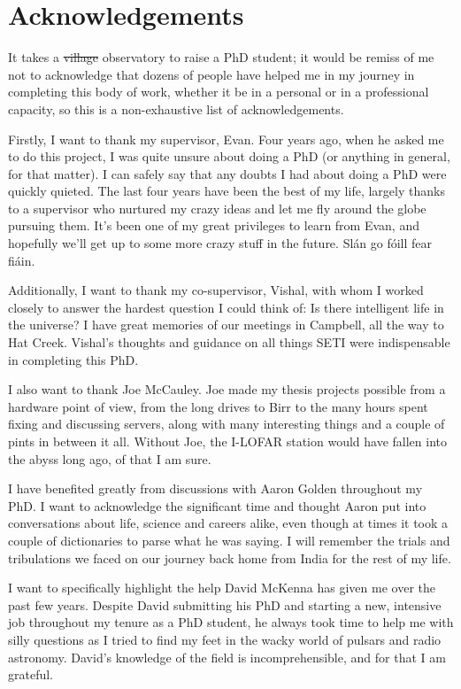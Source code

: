 \section*{Acknowledgements}

It takes a \sout{village} observatory to raise a PhD student; it would be remiss of me not to acknowledge that dozens of people have helped me in my journey in completing this body of work, whether it be in a personal or in a professional capacity, so this is a non-exhaustive list of acknowledgements.

Firstly, I want to thank my supervisor, Evan. Four years ago, when he asked me to do this project, I was quite unsure about doing a PhD (or anything in general, for that matter). I can safely say that any doubts I had about doing a PhD were quickly quieted. The last four years have been the best of my life, largely thanks to a supervisor who nurtured my crazy ideas and let me fly around the globe pursuing them.  It’s been one of my great privileges to learn from Evan, and hopefully we’ll get up to some more crazy stuff in the future. Slán go fóill fear fiáin. 

Additionally, I want to thank my co-supervisor, Vishal, with whom I worked closely to answer the hardest question I could think of: Is there intelligent life in the universe? I have great memories of our meetings in Campbell, all the way to Hat Creek. Vishal’s thoughts and guidance on all things SETI were indispensable in completing this PhD. 

I also want to thank Joe McCauley. Joe made my thesis projects possible from a hardware point of view, from the long drives to Birr to the many hours spent fixing and discussing servers, along with many interesting things and a couple of pints in between it all. Without Joe, the I-LOFAR station would have fallen into the abyss long ago, of that I am sure. 

I have benefited greatly from discussions with Aaron Golden throughout my PhD. I want to acknowledge the significant time and thought Aaron put into conversations about life, science and careers alike, even though at times it took a couple of dictionaries to parse what he was saying. I will remember the trials and tribulations we faced on our journey back home from India for the rest of my life. 

I want to specifically highlight the help David McKenna has given me over the past few years. Despite David submitting his PhD and starting a new, intensive job throughout my tenure as a PhD student, he always took time to help me with silly questions as I tried to find my feet in the wacky world of pulsars and radio astronomy. David’s knowledge of the field is incomprehensible, and for that I am grateful. 

